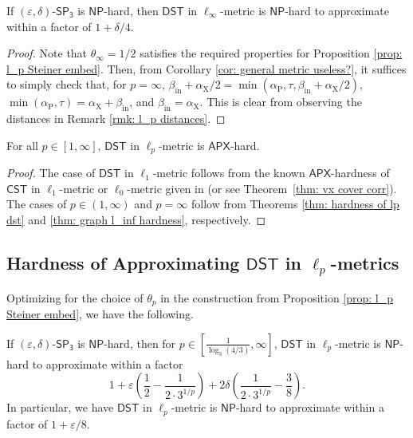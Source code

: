 \documentclass{theoretics}
\newcommand{\1}{\textbf{1}}
\newcommand{\cst}{$\mathsf{CST}$\xspace}
\newcommand{\setpT}{$\mathsf{SP_3}$\xspace}
\newcommand{\dst}{$\mathsf{DST}$\xspace}
\newcommand{\np}{$\mathsf{NP}$\xspace}
\newcommand{\apx}{$\mathsf{APX}$\xspace}
\newcommand{\td}{\tau}
\newcommand{\pcoord}{\theta_p}
\newcommand{\srd}{\alpha_{\text{X}}}
\newcommand{\trd}{\alpha_{\text{P}}}
\begin{document}
\begin{theorem} \label{thm: graph l_inf hardness}
If $(\varepsilon, \delta)$-\setpT is \np-hard, then \dst in $\ell_{\infty}$-metric is \np-hard to approximate within a factor of $1 + \delta/4$.
\end{theorem}
\begin{proof}
Note that $\theta_{\infty} = 1/2$ satisfies the required properties for Proposition \ref{prop: l_p Steiner embed}. Then, from Corollary \ref{cor: general metric useless?}, it suffices to simply check that, for $p = \infty$, $\beta_{\text{in}} + \srd/2 = \min(\trd, \td, \beta_{\text{in}} + \srd/2)$, $\min(\trd, \td) = \srd + \beta_{\text{in}}$, and $\beta_{\text{in}} = \srd$. This is clear from observing the distances in Remark \ref{rmk: l_p distances}.
\end{proof}

\begin{corollary}
For all $p \in [1, \infty]$,  \dst in $\ell_p$-metric is \apx-hard.
\end{corollary}
\begin{proof}
The case of \dst in $\ell_1$-metric follows from the known \apx-hardness of  \cst in $\ell_1$-metric or $\ell_0$-metric given in  \cite{Trevisan00} (or see Theorem~\ref{thm: vx cover corr}).   The cases of $p \in (1, \infty)$ and $p = \infty$ follow from Theorems \ref{thm: hardness of lp dst} and \ref{thm: graph l_inf hardness}, respectively.
\end{proof}



\subsection{Hardness of Approximating  \texorpdfstring{\dst}{DST} in \texorpdfstring{$\ell_p$}{lp}-metrics}\label{sec:figureexp}
Optimizing for the choice of $\pcoord$ in the construction from Proposition \ref{prop: l_p Steiner embed}, we have the following.
\begin{corollary} \label{cor: l_p tight hardness}
If $(\varepsilon, \delta)$-\setpT is \np-hard, then for $p \in [\frac{1}{\log_3(4/3)}, \infty]$,  \dst in $\ell_p$-metric is \np-hard to approximate within a
factor
\[ 
1+ \varepsilon \left(\frac{1}{2}-\frac{1}{2\cdot3^{1/p}} \right) + 2\delta \left(\frac{1}{2\cdot3^{1/p}}-\frac{3}{8} \right).
\]
In particular, we have  \dst in $\ell_p$-metric is \np-hard to approximate within a factor of $1 + \varepsilon/8$.
\end{corollary}
\end{document}
